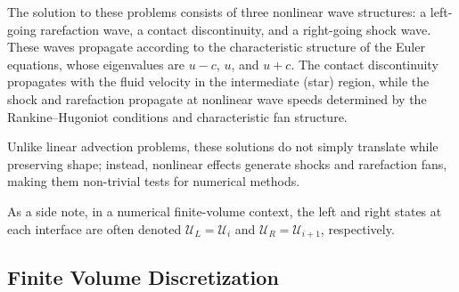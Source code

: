 \documentclass[12pt]{article}
\begin{document}
The solution to these problems consists of three nonlinear wave structures: a left-going rarefaction wave, a contact discontinuity, and a right-going shock wave. These waves propagate according to the characteristic structure of the Euler equations, whose eigenvalues are $u-c$, $u$, and $u+c$. The contact discontinuity propagates with the fluid velocity in the intermediate (star) region, while the shock and rarefaction propagate at nonlinear wave speeds determined by the Rankine–Hugoniot conditions and characteristic fan structure.

Unlike linear advection problems, these solutions do not simply translate while preserving shape; instead, nonlinear effects generate shocks and rarefaction fans, making them non-trivial tests for numerical methods.

As a side note, in a numerical finite-volume context, the left and right states at each interface are often denoted $\mathcal{U}_L =\mathcal{U}_i$ and $\mathcal{U}_R = \mathcal{U}_{i+1}$, respectively.


\subsection{Finite Volume Discretization}
\end{document}
